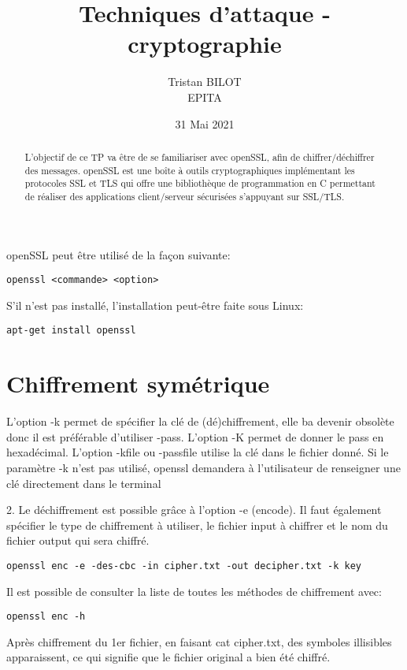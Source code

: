 \documentclass[12pt, oneside]{article}
\begin{document}
\title{Techniques d'attaque - cryptographie}
\author{Tristan BILOT\\EPITA}
\date{31 Mai 2021}
\maketitle

\begin{abstract}
L'objectif de ce TP va être de se familiariser avec openSSL, afin de chiffrer/déchiffrer des messages. openSSL est une boîte à outils cryptographiques implémentant les protocoles SSL et TLS qui offre une bibliothèque de programmation en C permettant de réaliser des applications client/serveur sécurisées s’appuyant sur SSL/TLS.
\end{abstract}
openSSL peut être utilisé de la façon suivante:
\begin{verbatim}
openssl <commande> <option>
\end{verbatim}
S'il n'est pas installé, l'installation peut-être faite sous Linux:
\begin{verbatim}
apt-get install openssl
\end{verbatim}

\section{Chiffrement symétrique}
L'option -k permet de spécifier la clé de (dé)chiffrement, elle ba devenir obsolète donc il est préférable d'utiliser -pass. 
L'option -K permet de donner le pass en hexadécimal. 
L'option -kfile ou -passfile utilise la clé dans le fichier donné. 
Si le paramètre -k n'est pas utilisé, openssl demandera à l'utilisateur de renseigner une clé directement dans le terminal

2. Le déchiffrement est possible grâce à l'option -e (encode). Il faut également spécifier le type de chiffrement à utiliser, le fichier input à chiffrer et le nom du fichier output qui sera chiffré. 
\begin{verbatim}
openssl enc -e -des-cbc -in cipher.txt -out decipher.txt -k key
\end{verbatim}

Il est possible de consulter la liste de toutes les méthodes de chiffrement avec:
\begin{verbatim}
openssl enc -h
\end{verbatim}

Après chiffrement du 1er fichier, en faisant cat cipher.txt, des symboles illisibles apparaissent, ce qui signifie que le fichier original a bien été chiffré. \\
\end{document}

